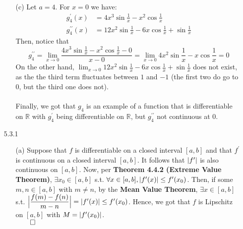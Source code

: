 \documentclass[11pt]{article}
\DeclarePairedDelimiter\abs{\lvert}{\rvert}%
\DeclarePairedDelimiter\absb{\Big\lvert}{\Big\rvert}%
\newcommand{\reals}{\mathbb{R}}
\begin{document}
\begin{itemize}
\begin{itemize}
            \item[(c)]
                Let $a = 4$. For $x = 0$ we have:
                \begin{align*}
                    g_4^\prime(x)         &= 4x^3\sin{\frac{1}{x}} - x^2\cos{\frac{1}{x}}\\
                    g_4^{\prime\prime}(x) &= 12x^2\sin{\frac{1}{x}} - 6x\cos{\frac{1}{x}} + \sin{\frac{1}{x}}
                \end{align*}
                Then, notice that
                \begin{equation*}
                    g_4^{\prime\prime} = \lim_{x \to 0}{\frac{4x^3\sin{\frac{1}{x}} - x^2\cos{\frac{1}{x}} - 0}{x - 0}}
                                       = \lim_{x \to 0}{4x^2\sin{\frac{1}{x}} - x\cos{\frac{1}{x}}}
                                       = 0
                \end{equation*}
                On the other hand, $\lim_{x \to 0}{12x^2\sin{\frac{1}{x}}} -
                6x\cos{\frac{1}{x}} + \sin{\frac{1}{x}}$ does not exist, as the
                the third term fluctuates between $1$ and $-1$ (the first two
                do go to $0$, but the third one does not).
                \\
                \\
                Finally, we got that $g_4$ is an example of a function that is
                differentiable on $\reals$ with $g_4^\prime$ being
                differentiable on $\reals$, but $g_4^{\prime\prime}$ not
                continuous at $0$.
        \end{itemize}

    \newpage

    \item[5.3.1]
        \begin{itemize}
            \item[(a)]
                Suppose that $f$ is differentiable on a closed interval $[a,
                b]$ and that $f^\prime$ is continuous on a closed interval $[a,
                b]$. It follows that $\abs{f^\prime}$ is also continuous on
                $[a, b]$. Now, per \textbf{Theorem 4.4.2 (Extreme Value
                Theorem)}, $\exists x_0 \in [a, b]$ s.t. $\forall x \in [a, b],
                \abs{f^\prime(x)} \leq f^\prime(x_0)$. Then, if some $m, n \in
                [a, b]$ with $m \neq n$, by the \textbf{Mean Value Theorem},
                $\exists x \in [a, b]$ s.t. $\absb{\dfrac{f(m) - f(n)}{m - n}}
                = \abs{f^\prime(x)} \leq f^\prime(x_0)$. Hence, we got that $f$
                is Lipschitz on $[a, b]$ with $M = \abs{f^\prime(x_0)}$.\\
                $\qed$


\end{itemize}
\end{itemize}
\end{document}
